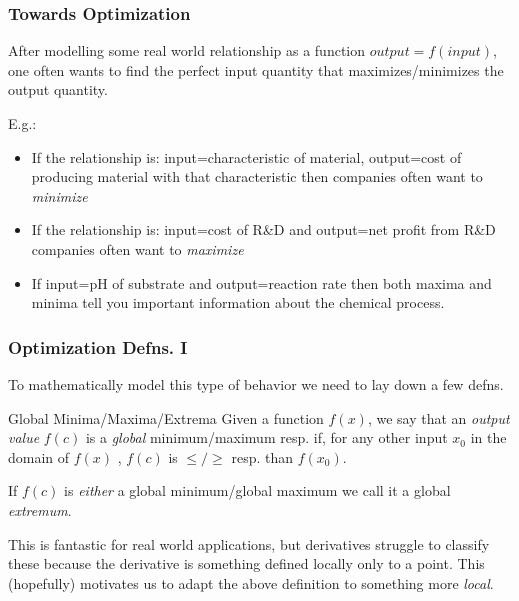 \documentclass{ltx-talk}
\begin{document}
\begin{frame}
  \frametitle{Towards Optimization}

  After modelling some real world relationship as a function $output = f(input)$, one often wants to find the perfect input quantity that
  maximizes/minimizes the output quantity. \pause

  E.g.:
  \begin{itemize}
    \item If the relationship is: input=characteristic of material, output=cost of producing material with that characteristic then companies often want to \textit{minimize} \pause
    \item If the relationship is: input=cost of R\&D and output=net profit from R\&D companies often want to \textit{maximize} \pause
    \item If input=pH of substrate and output=reaction rate then both maxima and minima tell you important information about the chemical process. \pause
  \end{itemize}
\end{frame}

\begin{frame}
  \frametitle{Optimization Defns. I}
  To mathematically model this type of behavior we need to lay down a few defns. \pause

  \begin{block}{Global Minima/Maxima/Extrema}
    Given a function $f(x)$, we say that an \textit{output value} $f(c)$
    is a \textit{global} minimum/maximum resp. if, \pause for any other input $x_0$ in the domain of $f(x)$ \pause, $f(c)$ is $\leq/\geq$ resp. than $f(x_0)$. \pause

    If $f(c)$ is \textit{either} a global minimum/global maximum we call it a global \textit{extremum}.
  \end{block} \pause

  This is fantastic for real world applications, but derivatives struggle
  to classify these because the derivative is something defined
  locally only to a point. \pause This (hopefully) motivates us to adapt the above definition to something more \textit{local}.
\end{frame}
\end{document}
